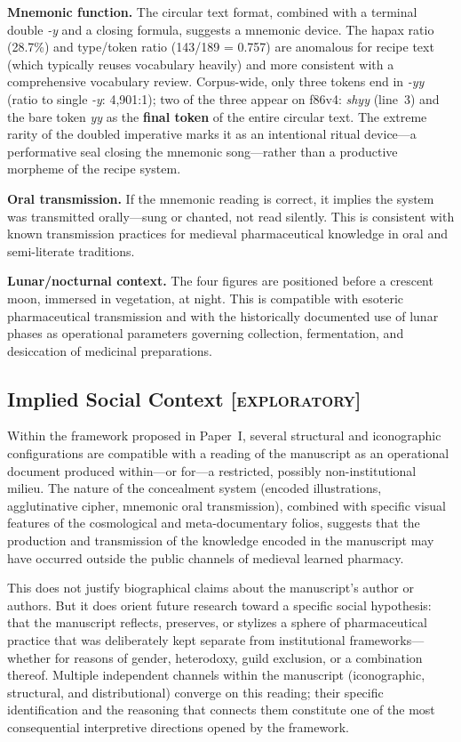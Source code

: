 \documentclass[11pt,a4paper]{article}
\newcommand{\exploratory}{\textsc{[exploratory]}}
\begin{document}
\textbf{Mnemonic function.} The circular text format, combined with a terminal double \textit{-y} and a closing formula, suggests a mnemonic device. The hapax ratio (28.7\%) and type/token ratio (143/189 = 0.757) are anomalous for recipe text (which typically reuses vocabulary heavily) and more consistent with a comprehensive vocabulary review. Corpus-wide, only three tokens end in \textit{-yy} (ratio to single \textit{-y}: 4,901:1); two of the three appear on f86v4: \textit{shyy} (line~3) and the bare token \textit{yy} as the \textbf{final token} of the entire circular text. The extreme rarity of the doubled imperative marks it as an intentional ritual device---a performative seal closing the mnemonic song---rather than a productive morpheme of the recipe system.

\textbf{Oral transmission.} If the mnemonic reading is correct, it implies the system was transmitted orally---sung or chanted, not read silently. This is consistent with known transmission practices for medieval pharmaceutical knowledge in oral and semi-literate traditions.

\textbf{Lunar/nocturnal context.} The four figures are positioned before a crescent moon, immersed in vegetation, at night. This is compatible with esoteric pharmaceutical transmission and with the historically documented use of lunar phases as operational parameters governing collection, fermentation, and desiccation of medicinal preparations.

\subsection{Implied Social Context \exploratory{}}

Within the framework proposed in Paper~I, several structural and iconographic configurations are compatible with a reading of the manuscript as an operational document produced within---or for---a restricted, possibly non-institutional milieu. The nature of the concealment system (encoded illustrations, agglutinative cipher, mnemonic oral transmission), combined with specific visual features of the cosmological and meta-documentary folios, suggests that the production and transmission of the knowledge encoded in the manuscript may have occurred outside the public channels of medieval learned pharmacy.

This does not justify biographical claims about the manuscript's author or authors. But it does orient future research toward a specific social hypothesis: that the manuscript reflects, preserves, or stylizes a sphere of pharmaceutical practice that was deliberately kept separate from institutional frameworks---whether for reasons of gender, heterodoxy, guild exclusion, or a combination thereof. Multiple independent channels within the manuscript (iconographic, structural, and distributional) converge on this reading; their specific identification and the reasoning that connects them constitute one of the most consequential interpretive directions opened by the framework.
\end{document}
